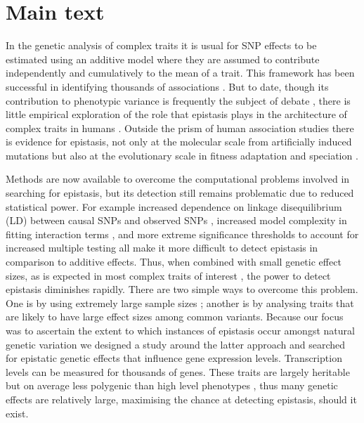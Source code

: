 \documentclass{article}
\begin{document}
\section*{Main text}

In the genetic analysis of complex traits it is usual for SNP effects to be estimated using an additive model where they are assumed to contribute independently and cumulatively to the mean of a trait. This framework has been successful in identifying thousands of associations \cite{Visscher2012}. But to date, though its contribution to phenotypic variance is frequently the subject of debate \cite{Carlborg2004, Hill2008a, Crow2010}, there is little empirical exploration of the role that epistasis plays in the architecture of complex traits in humans \cite{Strange2010, Evans2011}. Outside the prism of human association studies there is evidence for epistasis, not only at the molecular scale from artificially induced mutations \cite{Costanzo2010} but also at the evolutionary scale in fitness adaptation \cite{Weinreich2006} and speciation \cite{Breen2012}.

Methods are now available to overcome the computational problems involved in searching for epistasis, but its detection still remains problematic due to reduced statistical power. For example increased dependence on linkage disequilibrium (LD) between causal SNPs and observed SNPs \cite{Weir2008, Hemani2013}, increased model complexity in fitting interaction terms \cite{Marchini2005}, and more extreme significance thresholds to account for increased multiple testing \cite{Cordell2009} all make it more difficult to detect epistasis in comparison to additive effects. Thus, when combined with small genetic effect sizes, as is expected in most complex traits of interest \cite{Visscher2012}, the power to detect epistasis diminishes rapidly. There are two simple ways to overcome this problem. One is by using extremely large sample sizes \cite{LangoAllen2010}; another is by analysing traits that are likely to have large effect sizes among common variants. Because our focus was to ascertain the extent to which instances of epistasis occur amongst natural genetic variation we designed a study around the latter approach and searched for epistatic genetic effects that influence gene expression levels. Transcription levels can be measured for thousands of genes. These traits are largely heritable but on average less polygenic than high level phenotypes \cite{Powell2013}, thus many genetic effects are relatively large, maximising the chance at detecting epistasis, should it exist.
\end{document}
